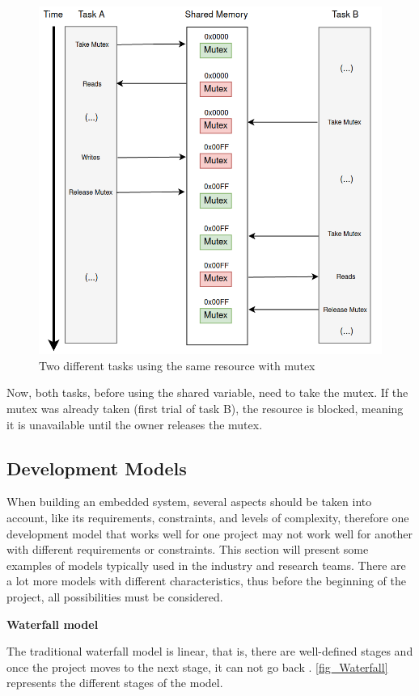 \begin{figure}[H]
	\centering
 	\includegraphics[width=0.7\linewidth]{Images/AfterMutex.png}
 	\caption{ Two different tasks using the same resource with mutex }
	 \label{fig_AfterMutex}
\end{figure}

Now, both tasks, before using the shared variable, need to take the mutex. If the mutex was already taken (first trial of task B), the resource 
is blocked, meaning it is unavailable until the owner releases the mutex. 


\subsection{Development Models}
\label{sub_sec::DevModels}

When building an embedded system, several aspects should be taken into account, like its requirements, constraints, and levels of complexity, 
therefore one development model that works well for one project may not work well for another with different requirements or constraints. This 
section will present some examples of models typically used in the industry and research teams. There are a lot more models with different 
characteristics, thus before the beginning of the project, all possibilities must be considered.
\newline

\textbf{Waterfall model}
\newline

The traditional waterfall model is linear, that is, there are well-defined stages and once the project moves to the next stage, it can not go 
back \cite{waterfallModel}. \autoref{fig_Waterfall} represents the different stages of the model. 

